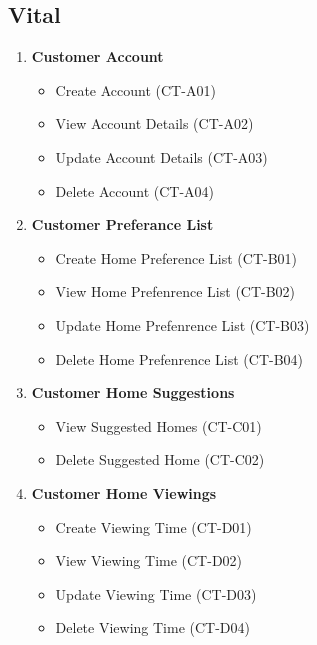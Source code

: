 \documentclass[11pt]{article}
\begin{document}
		\subsection{Vital}
			\begin{enumerate}[i]
				\item \textbf{Customer Account}
				\begin{itemize}
					\item Create Account (CT-A01)
					\item View Account Details (CT-A02)
					\item Update Account Details (CT-A03)
					\item Delete Account (CT-A04)
				\end{itemize}
				
				\item \textbf{Customer Preferance List}
				\begin{itemize}
					\item Create Home Preference List (CT-B01)
					\item View Home Prefenrence List (CT-B02)
					\item Update Home Prefenrence List (CT-B03)
					\item Delete Home Prefenrence List (CT-B04)
				\end{itemize}
				
				\item \textbf{Customer Home Suggestions}
				\begin{itemize}
					\item View Suggested Homes (CT-C01)
					\item Delete Suggested Home (CT-C02)
				\end{itemize}
				
				\item \textbf{Customer Home Viewings}
				\begin{itemize}
					\item Create Viewing Time (CT-D01)
					\item View Viewing Time (CT-D02)
					\item Update Viewing Time (CT-D03)
					\item Delete Viewing Time (CT-D04)
				\end{itemize}
			\end{enumerate}
\end{document}

